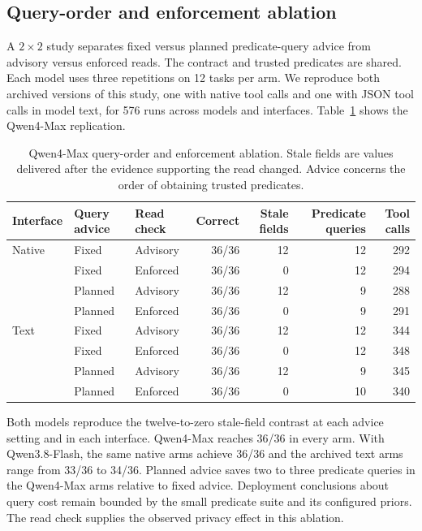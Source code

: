 \subsection{Query-order and enforcement ablation}
\label{sec:factorial}
A $2\times2$ study separates fixed versus planned predicate-query advice from advisory versus enforced reads. The contract and trusted predicates are shared. Each model uses three repetitions on 12 tasks per arm. We reproduce both archived versions of this study, one with native tool calls and one with JSON tool calls in model text, for 576 runs across models and interfaces. Table~\ref{tab:factorial} shows the Qwen4-Max replication.

\begin{table}[t]
\centering
\small
\begin{tabular}{@{}lllrrrr@{}}
\toprule
Interface & Query advice & Read check & Correct & Stale fields & Predicate queries & Tool calls\\
\midrule
Native & Fixed   & Advisory & 36/36 & 12 & 12 & 292\\
       & Fixed   & Enforced & 36/36 & 0  & 12 & 294\\
       & Planned & Advisory & 36/36 & 12 & 9  & 288\\
       & Planned & Enforced & 36/36 & 0  & 9  & 291\\
Text   & Fixed   & Advisory & 36/36 & 12 & 12 & 344\\
       & Fixed   & Enforced & 36/36 & 0  & 12 & 348\\
       & Planned & Advisory & 36/36 & 12 & 9  & 345\\
       & Planned & Enforced & 36/36 & 0  & 10 & 340\\
\bottomrule
\end{tabular}
\caption{Qwen4-Max query-order and enforcement ablation. Stale fields are values delivered after the evidence supporting the read changed. Advice concerns the order of obtaining trusted predicates.}
\label{tab:factorial}
\end{table}

Both models reproduce the twelve-to-zero stale-field contrast at each advice setting and in each interface. Qwen4-Max reaches 36/36 in every arm. With Qwen3.8-Flash, the same native arms achieve 36/36 and the archived text arms range from 33/36 to 34/36. Planned advice saves two to three predicate queries in the Qwen4-Max arms relative to fixed advice. Deployment conclusions about query cost remain bounded by the small predicate suite and its configured priors. The read check supplies the observed privacy effect in this ablation.
